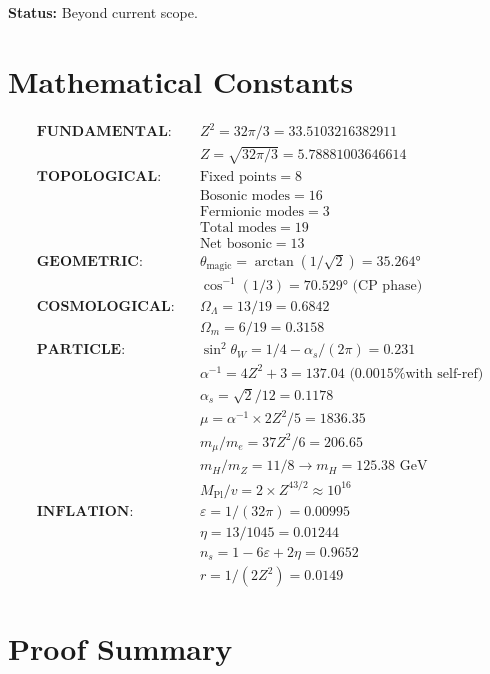 \documentclass[12pt,a4paper]{article}
\newcommand{\OmegaL}{\Omega_\Lambda}
\newcommand{\OmegaM}{\Omega_m}
\newcommand{\sinW}{\sin^2\theta_W}
\newcommand{\Zsq}{Z^2}
\begin{document}
\textbf{Status:} Beyond current scope.

\appendix

\section{Mathematical Constants}

\begin{align}
\textbf{FUNDAMENTAL:} \quad & \Zsq = 32\pi/3 = 33.5103216382911 \\
& Z = \sqrt{32\pi/3} = 5.78881003646614 \\[1em]
\textbf{TOPOLOGICAL:} \quad & \text{Fixed points} = 8 \\
& \text{Bosonic modes} = 16 \\
& \text{Fermionic modes} = 3 \\
& \text{Total modes} = 19 \\
& \text{Net bosonic} = 13 \\[1em]
\textbf{GEOMETRIC:} \quad & \theta_{\text{magic}} = \arctan(1/\sqrt{2}) = 35.264° \\
& \cos^{-1}(1/3) = 70.529° \text{ (CP phase)} \\[1em]
\textbf{COSMOLOGICAL:} \quad & \OmegaL = 13/19 = 0.6842 \\
& \OmegaM = 6/19 = 0.3158 \\[1em]
\textbf{PARTICLE:} \quad & \sinW = 1/4 - \alpha_s/(2\pi) = 0.231 \\
& \alpha^{-1} = 4\Zsq + 3 = 137.04 \text{ (0.0015\% with self-ref)} \\
& \alpha_s = \sqrt{2}/12 = 0.1178 \\
& \mu = \alpha^{-1} \times 2\Zsq/5 = 1836.35 \\
& m_\mu/m_e = 37\Zsq/6 = 206.65 \\
& m_H/m_Z = 11/8 \to m_H = 125.38 \text{ GeV} \\
& M_{\text{Pl}}/v = 2 \times Z^{43/2} \approx 10^{16} \\[1em]
\textbf{INFLATION:} \quad & \varepsilon = 1/(32\pi) = 0.00995 \\
& \eta = 13/1045 = 0.01244 \\
& n_s = 1 - 6\varepsilon + 2\eta = 0.9652 \\
& r = 1/(2\Zsq) = 0.0149
\end{align}

\section{Proof Summary}
\end{document}
